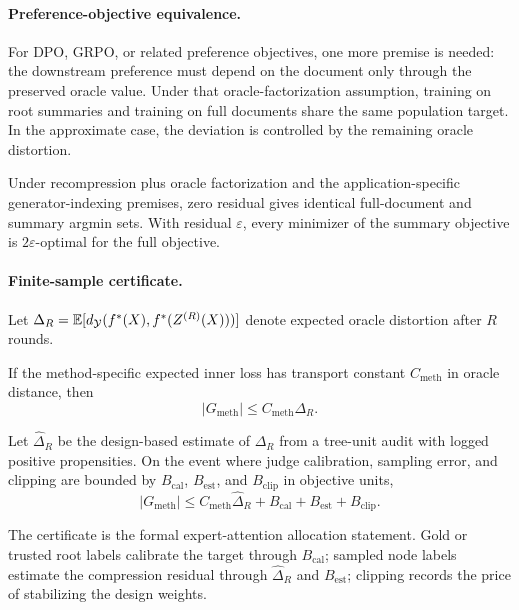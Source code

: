 \paragraph{Preference-objective equivalence.}
For DPO, GRPO, or related preference objectives, one more premise is needed:
the downstream preference must depend on the document only through the
preserved oracle value. Under that oracle-factorization assumption, training
on root summaries and training on full documents share the same population
target. In the approximate case, the deviation is controlled by the remaining
oracle distortion.

\begin{theorem}\label{thm:pref-equiv}
Under recompression plus oracle factorization and the application-specific
generator-indexing premises, zero residual gives identical full-document and
summary argmin sets. With residual $\varepsilon$, every minimizer of the
summary objective is $2\varepsilon$-optimal for the full objective.
\end{theorem}

\paragraph{Finite-sample certificate.}
Let
$\Delta_R=\mathbb{E}[d_{\mathcal{Y}}(f^\ast(X),f^\ast(Z^{(R)}(X)))]$ denote expected oracle
distortion after $R$ rounds.

\begin{theorem}\label{thm:unified-gap}
If the method-specific expected inner loss has transport constant
$C_{\mathrm{meth}}$ in oracle distance, then
\[
  |G_{\mathrm{meth}}|\le C_{\mathrm{meth}}\Delta_R.
\]
\end{theorem}

\begin{theorem}\label{thm:e2e}
Let $\hat\Delta_R$ be the design-based estimate of $\Delta_R$ from a
tree-unit audit with logged positive propensities. On the event where judge
calibration, sampling error, and clipping are bounded by
$B_{\mathrm{cal}}$, $B_{\mathrm{est}}$, and $B_{\mathrm{clip}}$ in objective
units,
\[
  |G_{\mathrm{meth}}|
  \le
  C_{\mathrm{meth}}\hat{\Delta}_R
  + B_{\mathrm{cal}} + B_{\mathrm{est}} + B_{\mathrm{clip}}.
\]
\end{theorem}

The certificate is the formal expert-attention allocation statement. Gold or
trusted root labels calibrate the target through $B_{\mathrm{cal}}$; sampled
node labels estimate the compression residual through $\hat\Delta_R$ and
$B_{\mathrm{est}}$; clipping records the price of stabilizing the design
weights.

